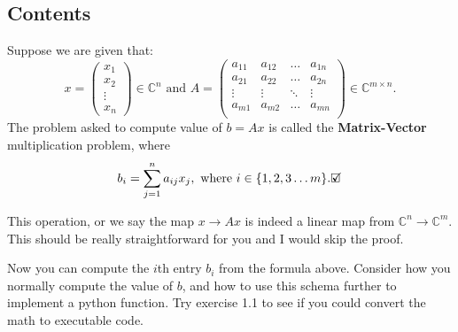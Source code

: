 \subsection*{Contents}
\begin{definition}
  Suppose we are given that:
  \[
    x = \begin{pmatrix} x_1\\x_2\\ \vdots\\ x_n \end{pmatrix} \in \mathbb{C}^{n} \text{ and } 
      A = \begin{pmatrix} 
      a_{11} & a_{12} & \ldots & a_{1n} \\
    a_{21} & a_{22} & \ldots & a_{2n} \\ 
    \vdots & \vdots & \ddots & \vdots \\
    a_{m1} & a_{m2} & \ldots & a_{mn} \\  
    \end{pmatrix} \in \mathbb{C}^{m \times n}
  .\] 
  The problem asked to compute value of $b = Ax$ is called the \textbf{Matrix-Vector} multiplication problem, where
  \[
    b_i = \sum_{j = 1}^{n} a_{ij}x_j, \text{ where } i \in \{1, 2, 3 \ldots m\} 
    .\checked\] 
\end{definition}
This operation, or we say the map $x \to  Ax$ is indeed a linear map from $\mathbb{C}^{n} \to \mathbb{C}^{m}$. 
This should be really straightforward for you and I would skip the proof. \medskip

\noindent Now you can compute the \(i\)th entry \(b_i\) from the formula above. Consider how you normally compute the value of \(b\), and how to use this schema further to implement a python function. Try exercise 1.1 to see if you could convert the math to executable code.
